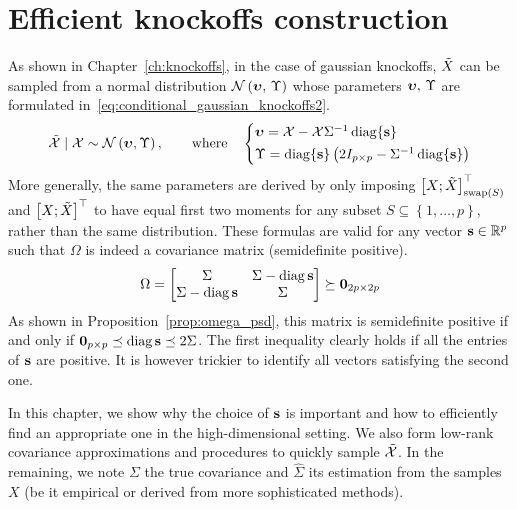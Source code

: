 \chapter{Efficient knockoffs construction}\label{ch:sdp}

As shown in Chapter~\ref{ch:knockoffs}, in the case of gaussian knockoffs,
$\tilde{X}$ can be sampled from a normal distribution $\mathcal{N}\left( \bm{\upsilon},\, \Upsilon \right)$ whose parameters
$\bm{\upsilon},\, \Upsilon$ are formulated in~\ref{eq:conditional_gaussian_knockoffs2}.
\begin{equation}\label{eq:conditional_gaussian_knockoffs2}
    \tcX \mid \cX \sim \cN\left( \bupsilon, \Upsilon \right)
    ,\qquad\text{where}\quad
    \begin{cases*}
        \bupsilon = \cX - \cX\Sigma^{-1}\diag\{ \bs \}\\
        \Upsilon = \diag\{ \bs \}\left( 2I_{p \times p} - \Sigma^{-1}\diag\{ \bs \} \right)
    \end{cases*}
\end{equation}
More generally, the same parameters are derived by only imposing
$\big[ X; \tilde{X} \big]_{\operatorname{swap}\left( S \right)}^\top$ and $\big[ X; \tilde{X} \big]^\top$
to have equal first two moments
for any subset
$S \subseteq \left\{ 1, \dots, p \right\}$,
rather than the same distribution.
These formulas are valid for any vector $\mathbf{s} \in \mathbb{R}^p$ such that $\Omega$
is indeed a covariance matrix (semidefinite positive).
\begin{equation*}
    \Omega = \begin{bmatrix}
        \Sigma & \Sigma - \operatorname*{diag} \mathbf{s}\\
        \Sigma - \operatorname*{diag} \mathbf{s} & \Sigma
    \end{bmatrix}
    \succeq \mathbf{0}_{2p \times 2p}
\end{equation*}
As shown in Proposition~\ref{prop:omega_psd},
this matrix is semidefinite positive if and only if $\mathbf{0}_{p \times p} \preceq \operatorname*{diag} \mathbf{s} \preceq 2 \Sigma$.
The first inequality clearly holds if all the entries of $\mathbf{s}$ are positive.
It is however trickier to identify all vectors satisfying the second one.

In this chapter, we show why the choice of $\mathbf{s}$ is important and how to efficiently find an appropriate one
in the high-dimensional setting.
We also form low-rank covariance approximations and procedures to quickly sample $\tilde{\mathcal{X}}$.
In the remaining, we note $\Sigma$ the true covariance and $\hat{\Sigma}$ its estimation from the samples $X$
(be it empirical or derived from more sophisticated methods).

